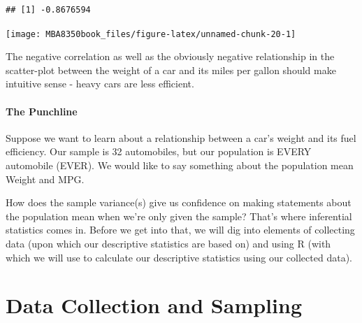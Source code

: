 \documentclass[
]{book}
\newenvironment{Shaded}{\begin{snugshade}}{\end{snugshade}}
\newcommand{\AttributeTok}[1]{\textcolor[rgb]{0.77,0.63,0.00}{#1}}
\newcommand{\FunctionTok}[1]{\textcolor[rgb]{0.00,0.00,0.00}{#1}}
\newcommand{\NormalTok}[1]{#1}
\newcommand{\SpecialCharTok}[1]{\textcolor[rgb]{0.00,0.00,0.00}{#1}}
\newcommand{\StringTok}[1]{\textcolor[rgb]{0.31,0.60,0.02}{#1}}
\begin{document}
\begin{verbatim}
## [1] -0.8676594
\end{verbatim}

\begin{Shaded}
\end{Shaded}

\begin{center}\texttt{[image: MBA8350book\_files/figure-latex/unnamed-chunk-20-1]} \end{center}

The negative correlation as well as the obviously negative relationship in the scatter-plot between the weight of a car and its miles per gallon should make intuitive sense - heavy cars are less efficient.

\hypertarget{the-punchline}{%
\subsubsection*{The Punchline}\label{the-punchline}}

Suppose we want to learn about a relationship between a car's weight and its fuel efficiency. Our sample is 32 automobiles, but our population is EVERY automobile (EVER). We would like to say something about the population mean Weight and MPG.

How does the sample variance(s) give us confidence on making statements about the population mean when we're only given the sample? That's where inferential statistics comes in. Before we get into that, we will dig into elements of collecting data (upon which our descriptive statistics are based on) and using R (with which we will use to calculate our descriptive statistics using our collected data).

\hypertarget{Data}{%
\chapter{Data Collection and Sampling}\label{Data}}
\end{document}
